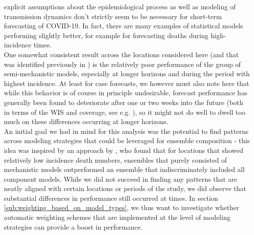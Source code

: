 explicit assumptions about the epidemiological process as well as modeling of transmission dynamics don't strictly seem to be necessary for short-term forecasting of COVID-19. In fact, there are many examples of statistical models performing slightly better, for example for forecasting deaths during high-incidence times.\\ 
One somewhat consistent result across the locations considered here (and that was identified previously in \cite{bracher_evaluating_2021}) is the relatively poor performance of the group of semi-mechanistic models, especially at longer horizons and during the period with highest incidence. At least for case forecasts, we however must also note here that while this behavior is of course in principle undesirable, forecast performance has generally been found to deteriorate after one or two weeks into the future (both in terms of the WIS and coverage, see e.g. \cite{sherratt_european_2022}), so it might not do well to dwell too much on these differences occurring at longer horizons.\\
An initial goal we had in mind for this analysis was the potential to find patterns across modeling strategies that could be leveraged for ensemble composition - this idea was inspired by an approach by \cite{taylor_combining_2021}, who found that for locations that showed relatively low incidence death numbers, ensembles that purely consisted of mechanistic models outperformed an ensemble that indiscriminately included all component models. While we did not succeed in finding any patterns that are neatly aligned with certain locations or periods of the study, we did observe that substantial differences in performance still occurred at times. In section \ref{sub:weighting_based_on_model_types}, we thus want to investigate whether automatic weighting schemes that are implemented at the level of modeling strategies can provide a boost in performance.
